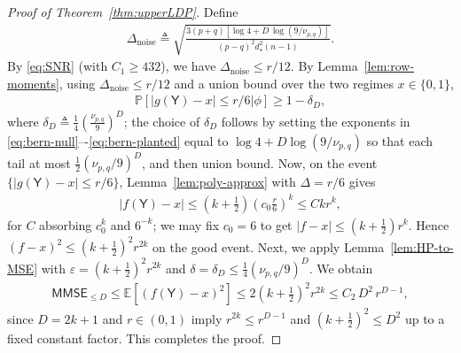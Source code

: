 \documentclass[12pt]{article}
\newcommand{\bE}{\mathbb{E}}
\newcommand{\abs}[1]{\left|#1\right|}
\newcommand{\p}[1]{\left(#1\right)}
\newcommand{\pp}[1]{\left[#1\right]}
\newcommand{\s}[1]{\mathsf{#1}}
\begin{document}
\begin{proof}[Proof of Theorem~\ref{thm:upperLDP}]
Define
\begin{align}
\Delta_{\mathrm{noise}}\triangleq\sqrt{\frac{3(p+q)\pp{\log 4 + D\,\log(9/\nu_{p,q})}}{(p-q)^2d_\star^2(n-1)}}.
\end{align}
By \eqref{eq:SNR} (with $C_1\ge 432$), we have $\Delta_{\mathrm{noise}}\leq r/12$. By Lemma~\ref{lem:row-moments}, using $\Delta_{\mathrm{noise}}\le r/12$ and a union bound over the two regimes $x\in\{0,1\}$,
\begin{align}
\mathbb{P}\pp{\left.\abs{g(\s{Y})-x}\le r/6\right|\phi}\geq1-\delta_D,
\end{align}
where $\delta_D\triangleq\tfrac{1}{4}\p{\frac{\nu_{p,q}}{9}}^{D}$; the choice of $\delta_D$ follows by setting the exponents in \eqref{eq:bern-null}–-\eqref{eq:bern-planted} equal to $\log 4 + D\log(9/\nu_{p,q})$ so that each tail at most $\tfrac12(\nu_{p,q}/9)^D$, and then union bound. Now, on the event $\{|g(\s{Y})-x|\leq r/6\}$, Lemma~\ref{lem:poly-approx} with $\Delta=r/6$ gives
\begin{align}
|f(\s{Y})-x|\leq(k+\tfrac12)\p{c_0\tfrac{r}{6}}^{k}\le Ckr^{k},
\end{align}
for $C$ absorbing $c_0^k$ and $6^{-k}$; we may fix $c_0=6$ to get $|f-x|\leq (k+\tfrac12)r^k$. Hence $(f-x)^2\leq (k+\tfrac12)^2 r^{2k}$ on the good event. Next, we apply Lemma~\ref{lem:HP-to-MSE} with $\varepsilon=(k+\tfrac12)^2 r^{2k}$ and $\delta=\delta_D\le \tfrac14(\nu_{p,q}/9)^D$. We obtain
\begin{align}
\s{MMSE}_{\leq D}\leq \bE[(f(\s{Y})-x)^2]\leq2(k+\tfrac12)^2r^{2k}\leq C_2\,D^2\,r^{D-1},
\end{align}
since $D=2k+1$ and $r\in(0,1)$ imply $r^{2k}\leq r^{D-1}$ and $(k+\tfrac12)^2\leq D^2$ up to a fixed constant factor. This completes the proof.
\end{proof}
\end{document}
